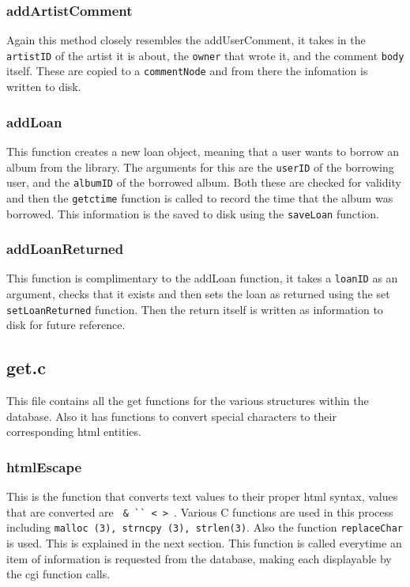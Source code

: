 \documentclass{article}
\begin{document}
\subsubsection*{addArtistComment}
Again this method closely resembles the addUserComment, it takes in the \verb|artistID| of the artist it is about, the \verb|owner| that wrote it, and the comment \verb|body| itself. These are copied to a \verb|commentNode| and from there the infomation is written to disk.

\subsubsection*{addLoan}
This function creates a new loan object, meaning that a user wants to borrow an album from the library. The arguments for this are the \verb|userID| of the borrowing user, and the \verb|albumID| of the borrowed album. Both these are checked for validity and then the \verb|getctime| function is called to record the time that the album was borrowed. This information is the saved to disk using the \verb|saveLoan| function.

\subsubsection*{addLoanReturned}
This function is complimentary to the addLoan function, it takes a \verb|loanID| as an argument, checks that it exists and then sets the loan as returned using the set \verb|setLoanReturned| function. Then the return itself is written as information to disk for future reference.

\subsection{get.c}
This file contains all the get functions for the various structures within the database. Also it has functions to convert special characters to their corresponding html entities.

\subsubsection*{htmlEscape}
This is the function that converts text values to their proper html syntax, values that are converted are \verb| & `` < > |. Various C functions are used in this process including \verb|malloc (3), strncpy (3), strlen(3)|. Also the function \verb|replaceChar| is used. This is explained in the next section. This function is called everytime an item of information is requested from the database, making each displayable by the cgi function calls.
\end{document}
